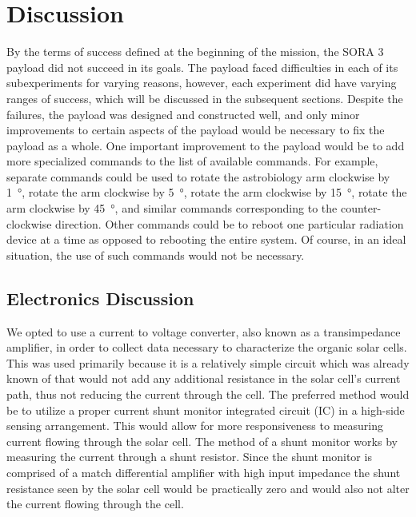 \section{Discussion}
\label{sec:Discussion}

By the terms of success defined at the beginning of the mission, the SORA 3 payload did not succeed in its goals.
The payload faced difficulties in each of its subexperiments for varying reasons, however, each experiment did have varying ranges of success, which will be discussed in the subsequent sections.
Despite the failures, the payload was designed and constructed well, and only minor improvements to certain aspects of the payload would be necessary to fix the payload as a whole.
One important improvement to the payload would be to add more specialized commands to the list of available commands.
For example, separate commands could be used to rotate the astrobiology arm clockwise by \SI{1}{\degree}, rotate the arm clockwise by \SI{5}{\degree}, rotate the arm clockwise by \SI{15}{\degree}, rotate the arm clockwise by \SI{45}{\degree}, and similar commands corresponding to the counter-clockwise direction.
Other commands could be to reboot one particular radiation device at a time as opposed to rebooting the entire system.
Of course, in an ideal situation, the use of such commands would not be necessary.

\subsection{Electronics Discussion}
\label{subsec:Electronics-Discussion}
We opted to use a current to voltage converter, also known as a transimpedance amplifier, in order to collect data necessary to characterize the organic solar cells.
This was used primarily because it is a relatively simple circuit which was already known of that would not add any additional resistance in the solar cell's current path, thus not reducing the current through the cell.
The preferred method would be to utilize a proper current shunt monitor integrated circuit (IC) in a high-side sensing arrangement.
This would allow for more responsiveness to measuring current flowing through the solar cell.
The method of a shunt monitor works by measuring the current through a shunt resistor.
Since the shunt monitor is comprised of a match differential amplifier with high input impedance the shunt resistance seen by the solar cell would be practically zero and would also not alter the current flowing through the cell.

